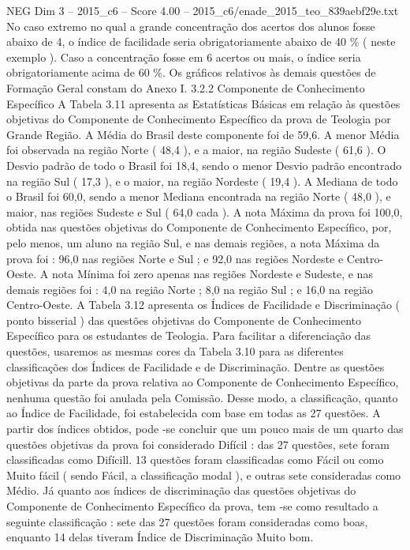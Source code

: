 \begin{textsample}{NEG Dim 3 – 2015\_c6 – Score 4.00 – 2015\_c6/enade\_2015\_teo\_839aebf29e.txt}
No caso extremo no qual a grande concentração dos acertos dos alunos fosse abaixo de 4, o índice de facilidade seria obrigatoriamente abaixo de 40 \% ( neste exemplo ).
Caso a concentração fosse em 6 acertos ou mais, o índice seria obrigatoriamente acima de 60 \%.
Os gráficos relativos às demais questões de Formação Geral constam do Anexo I. 3.2.2 Componente de Conhecimento Específico A Tabela 3.11 apresenta as Estatísticas Básicas em relação às questões objetivas do Componente de Conhecimento Específico da prova de Teologia por Grande Região.
A Média do Brasil deste componente foi de 59,6.
A menor Média foi observada na região Norte ( 48,4 ), e a maior, na região Sudeste ( 61,6 ).
O Desvio padrão de todo o Brasil foi 18,4, sendo o menor Desvio padrão encontrado na região Sul ( 17,3 ), e o maior, na região Nordeste ( 19,4 ).
A Mediana de todo o Brasil foi 60,0, sendo a menor Mediana encontrada na região Norte ( 48,0 ), e maior, nas regiões Sudeste e Sul ( 64,0 cada ).
A nota Máxima da prova foi 100,0, obtida nas questões objetivas do Componente de Conhecimento Específico, por, pelo menos, um aluno na região Sul, e nas demais regiões, a nota Máxima da prova foi : 96,0 nas regiões Norte e Sul ; e 92,0 nas regiões Nordeste e Centro-Oeste.
A nota Mínima foi zero apenas nas regiões Nordeste e Sudeste, e nas demais regiões foi : 4,0 na região Norte ; 8,0 na região Sul ; e 16,0 na região Centro-Oeste.
A Tabela 3.12 apresenta os Índices de Facilidade e Discriminação ( ponto bisserial ) das questões objetivas do Componente de Conhecimento Específico para os estudantes de Teologia.
Para facilitar a diferenciação das questões, usaremos as mesmas cores da Tabela 3.10 para as diferentes classificações dos Índices de Facilidade e de Discriminação.
Dentre as questões objetivas da parte da prova relativa ao Componente de Conhecimento Específico, nenhuma questão foi anulada pela Comissão.
Desse modo, a classificação, quanto ao Índice de Facilidade, foi estabelecida com base em todas as 27 questões.
A partir dos índices obtidos, pode -se concluir que um pouco mais de um quarto das questões objetivas da prova foi considerado Difícil : das 27 questões, sete foram classificadas como Difícill. 13 questões foram classificadas como Fácil ou como Muito fácil ( sendo Fácil, a classificação modal ), e outras sete consideradas como Médio.
Já quanto aos índices de discriminação das questões objetivas do Componente de Conhecimento Específico da prova, tem -se como resultado a seguinte classificação : sete das 27 questões foram consideradas como boas, enquanto 14 delas tiveram Índice de Discriminação Muito bom.

\end{textsample}
